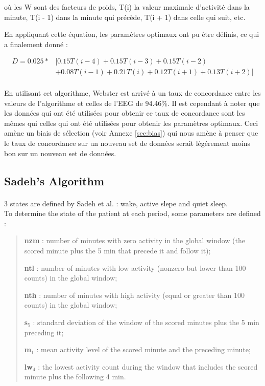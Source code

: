 \documentclass[a4paper,10pt]{article}
\begin{document}
où les W sont des facteurs de poids, T(i) la valeur maximale d'activité dans la minute, T(i - 1) dans la minute qui précède, T(i + 1) dans celle qui suit, etc.

En appliquant cette équation, les paramètres optimaux ont pu être définis, ce qui a finalement donné :

\begin{equation}
\begin{split}
D = 0.025 * &[0.15 T(i-4) + 0.15 T(i - 3) + 0.15 T(i - 2)\\
         &+ 0.08 T(i - 1) + 0.21 T(i) + 0.12 T(i+1) + 0.13 T(i+2)]
\end{split}
\end{equation}

\paragraph{}
En utilisant cet algorithme, Webster est arrivé à un taux de concordance entre les valeurs de l'algorithme et celles de l'EEG de 94.46\%. Il est cependant à noter que les données qui ont été utilisées pour obtenir ce taux de concordance sont les mêmes qui celles qui ont été utilisées pour obtenir les paramètres optimaux. Ceci amène un biais de sélection (voir Annexe \ref{sec:bias}) qui nous amène à penser que le taux de concordance sur un nouveau set de données serait légérement moins bon sur un nouveau set de données.



\subsection{Sadeh's Algorithm}

\paragraph{}
3 states are defined by Sadeh et al. \cite{Sadeh1995} : wake, active slepe and quiet sleep. \\

To determine the state of the patient at each period, some parameters are defined \cite{Sadeh1995} :
\begin{quotation}
\em 
\item \textbf{nzm} : number of minutes with zero activity in the global window (the scored minute plus the 5 min that precede it and follow it);
\item \textbf{ntl} : number of minutes with low activity (nonzero but lower than 100 counts) in the global window;
\item \textbf{nth} : number of minutes with high activity (equal or greater than 100 counts) in the global window;
\item \textbf{s}$_5$ : standard deviation of the window of the scored minutes plus the 5 min preceding it;
\item \textbf{m}$_1$ : mean activity level of the scored minute and the preceding minute;
\item \textbf{lw}$_4$ : the lowest activity count during the window that includes the scored minute plus the following 4 min.  
\end{quotation}
\end{document}
